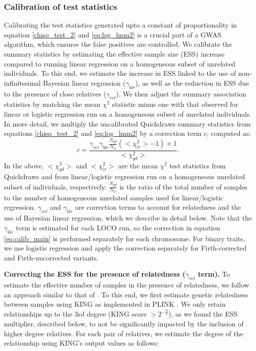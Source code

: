 \subsubsection{Calibration of test statistics}

Calibrating the test statistics generated upto a constant of proportionality in equation \ref{chisq_test_2} and \ref{eq:log_lmm2} is a crucial part of a GWAS algorithm, which ensures the false positives are controlled.
%
We calibrate the summary statistics by estimating the effective sample size (ESS) increase compared to running linear regression on a homogeneous subset of unrelated individuals.
%
To this end, we estimate the increase in ESS linked to the use of non-infinitesimal Bayesian linear regression ($\gamma_{blr}$), as well as the reduction in ESS due to the presence of close relatives ($\gamma_{rel}$).
%
We then adjust the summary association statistics by matching the mean $\chi^2$ statistic minus one \cite{yang2011genomic} with that observed for linear or logistic regression run on a homogeneous subset of unrelated individuals.
%
In more detail, we multiply the uncalibrated Quickdraws summary statistics from equations \ref{chisq_test_2} and \ref{eq:log_lmm2} by a correction term $c$, computed as:
\begin{equation}
c = \frac{\gamma_{rel}\gamma_{blr}\frac{N_{qd}}{N_{lr}}(<\chi_{lr}^2> - 1) + 1}{<\chi_{qd}^2>}.
\label{eq:calib_main}
\end{equation}
In the above, $<\chi_{qd}^2>$ and $<\chi_{lr}^2>$ are the mean $\chi^2$ test statistics from Quickdraws and from linear/logistic regression run on a homogeneous unrelated subset of individuals, respectively.
%
$\frac{N_{qd}}{N_{lr}}$ is the ratio of the total number of samples to the number of homogeneous unrelated samples used for linear/logistic regression.
%
$\gamma_{rel}$ and $\gamma_{blr}$ are correction terms to account for relatedness and the use of Bayesian linear regression, which we describe in detail below.
%
Note that the $\gamma_{blr}$ term is estimated for each LOCO run, so the correction in equation \ref{eq:calib_main} is performed separately for each chromosome.
%
For binary traits, we use logistic regression and apply the correction separately for Firth-corrected and Firth-uncorrected variants.

\vspace{2mm}

%
\noindent \textbf{Correcting the ESS for the presence of relatedness ($\gamma_{rel}$ term).} To estimate the effective number of samples in the presence of relatedness, we follow an approach similar to that of \cite{ziyatdinov2021estimating}.
%
To this end, we first estimate genetic relatedness between samples using KING \cite{manichaikul2010robust} as implemented in PLINK \cite{chang2015second}.
%
We only retain relationships up to the 3rd degree (KING score $>2^{-\frac{9}{2}}$), as we found the ESS multiplier, described below, to not be significantly impacted by the inclusion of higher degree relatives.
%
For each pair of relatives, we estimate the degree of the relationship using KING’s output values as follows:

